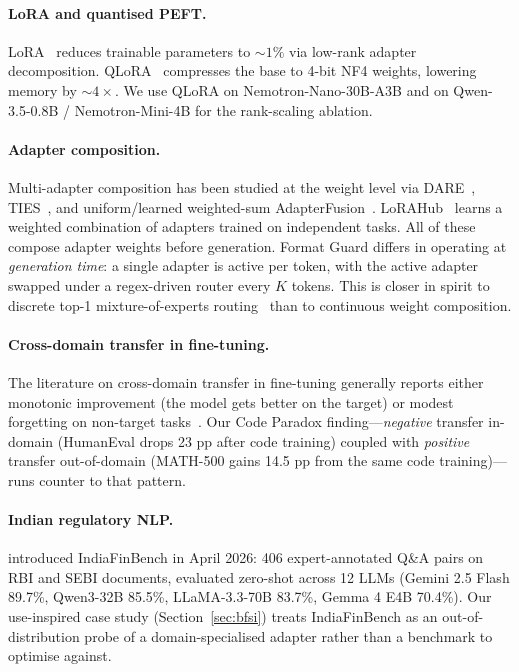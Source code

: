 \documentclass{article}
\begin{document}
\paragraph{LoRA and quantised PEFT.} LoRA~\citep{hu2022lora} reduces trainable parameters to $\sim 1\%$ via low-rank adapter decomposition. QLoRA~\citep{dettmers2023qlora} compresses the base to 4-bit NF4 weights, lowering memory by $\sim 4\times$. We use QLoRA on Nemotron-Nano-30B-A3B and on Qwen-3.5-0.8B / Nemotron-Mini-4B for the rank-scaling ablation.

\paragraph{Adapter composition.} Multi-adapter composition has been studied at the weight level via DARE~\citep{yu2024dare}, TIES~\citep{yadav2023ties}, and uniform/learned weighted-sum AdapterFusion~\citep{pfeiffer2021adapterfusion}. LoRAHub~\citep{huang2023lorahub} learns a weighted combination of adapters trained on independent tasks. All of these compose adapter weights before generation. Format Guard differs in operating at \emph{generation time}: a single adapter is active per token, with the active adapter swapped under a regex-driven router every $K$ tokens. This is closer in spirit to discrete top-1 mixture-of-experts routing~\citep{shazeer2017moe, fedus2022switch} than to continuous weight composition.

\paragraph{Cross-domain transfer in fine-tuning.} The literature on cross-domain transfer in fine-tuning generally reports either monotonic improvement (the model gets better on the target) or modest forgetting on non-target tasks~\citep{howard2018ulmfit, gururangan2020dontstop}. Our Code Paradox finding---\emph{negative} transfer in-domain (HumanEval drops 23 pp after code training) coupled with \emph{positive} transfer out-of-domain (MATH-500 gains 14.5 pp from the same code training)---runs counter to that pattern.

\paragraph{Indian regulatory NLP.} \citet{pall2026indiafinbench} introduced IndiaFinBench in April 2026: 406 expert-annotated Q\&A pairs on RBI and SEBI documents, evaluated zero-shot across 12 LLMs (Gemini 2.5 Flash 89.7\%, Qwen3-32B 85.5\%, LLaMA-3.3-70B 83.7\%, Gemma 4 E4B 70.4\%). Our use-inspired case study (Section~\ref{sec:bfsi}) treats IndiaFinBench as an out-of-distribution probe of a domain-specialised adapter rather than a benchmark to optimise against.
\end{document}
